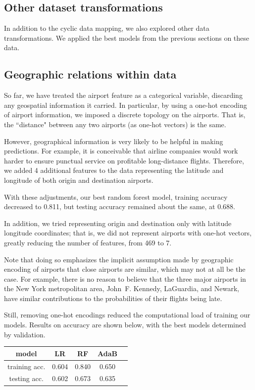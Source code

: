 \documentclass{article}
\begin{document}
\begin{multicols}{2}
\section{Other dataset transformations}
\label{sec:dataset}

In addition to the cyclic data mapping,
we also explored other data transformations.
We applied the best models from the previous sections
on these data.

\subsection{Geographic relations within data}

So far, we have treated the airport feature as a categorical variable,
discarding any geospatial information it carried.
In particular,
by using a one-hot encoding of airport information,
we imposed a discrete topology on the airports.
That is, the ``distance" between any two airports
(as one-hot vectors) is the same.

However, geographical information
is very likely to be helpful in making predictions.
For example, it is conceivable that airline companies
would work harder to ensure punctual service
on profitable long-distance flights.
Therefore, we added 4 additional features to the data
representing the latitude and longitude
of both origin and destination airports.

With these adjustments,
our best random forest model,
training accuracy decreased to 0.811,
but testing accuracy remained about the same,
at 0.688.

In addition, we tried representing origin and destination
only with latitude longitude coordinates;
that is, we did not represent airports with one-hot vectors,
greatly reducing the number of features, from 469 to 7.

Note that doing so emphasizes the implicit assumption
made by geographic encoding of airports
that close airports are similar,
which may not at all be the case.
For example, there is no reason to believe
that the three major airports
in the New York metropolitan area,
John~F. Kennedy, LaGuardia, and Newark,
have similar contributions to the probabilities of their flights being late.

Still,
removing one-hot encodings
reduced the computational load of training our models.
Results on accuracy are shown below,
with the best models determined by validation.

\begin{center}
    \begin{tabular}{c|cccc}
        model &
          LR & RF & AdaB \\\hline
        training acc. &
          0.604 & 0.840 & 0.650 \\
        testing acc. &
          0.602 & 0.673 & 0.635
    \end{tabular}
\end{center}


\end{multicols}
\end{document}
